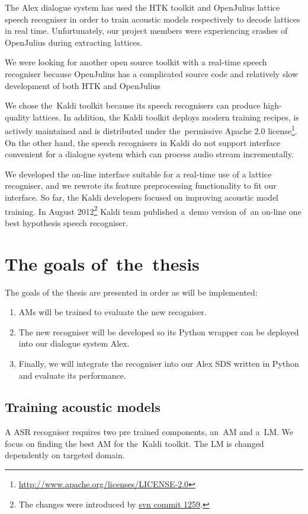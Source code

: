 The Alex dialogue system has used the \ac{HTK} toolkit\cite{young94htk} and OpenJulius\cite{lee2009julius} lattice speech recogniser in order to train acoustic models respectively to decode lattices in real time. 
Unfortunately, our project members were experiencing crashes of OpenJulius during extracting lattices.

We were looking for another open source toolkit with a real-time speech recogniser because OpenJulius has a complicated source code and relatively slow development of both \ac{HTK} and OpenJulius

We chose the~Kaldi toolkit because its speech recognisers can produce high-quality lattices.\cite{povey2012generating}
In addition, the Kaldi toolkit deploys modern training recipes, is actively maintained and is distributed under the~permissive Apache 2.0 license\footnote{\url{http://www.apache.org/licenses/LICENSE-2.0}}.
On the other hand, the speech recognisers in Kaldi do not support interface convenient for a dialogue system which can process audio stream incrementally.

We developed the on-line interface suitable for a real-time use of a lattice recogniser, and we rewrote its feature preprocessing functionality to fit our interface.
So far, the Kaldi developers focused on improving acoustic model training. 
In August 2012\footnote{The changes were introduced by \href{https://sourceforge.net/p/kaldi/code/1259/}{svn commit 1259}.} Kaldi team published a~demo version of~an on-line one best hypothesis speech recogniser.

\section{The goals of~the~thesis} 
\label{sec:goals}
The goals of the thesis are presented in order as will be implemented:
\begin{enumerate}
    \item \acp{AM} will be trained to evaluate the new recogniser.
    \item The new recogniser will be developed so its Python wrapper can be deployed into our dialogue system Alex.
    \item Finally, we will integrate the recogniser into our Alex \ac{SDS} written in Python and evaluate its performance.
\end{enumerate}

\subsection{Training acoustic models} 
\label{sub:training_kaldi_acoustic_models}
A \acl{ASR} recogniser requires two pre trained components, an~\acl{AM} and a~\acl{LM}. 
We focus on finding the best \acl{AM} for the~Kaldi toolkit. 
The \acl{LM} is changed dependently on targeted domain.

